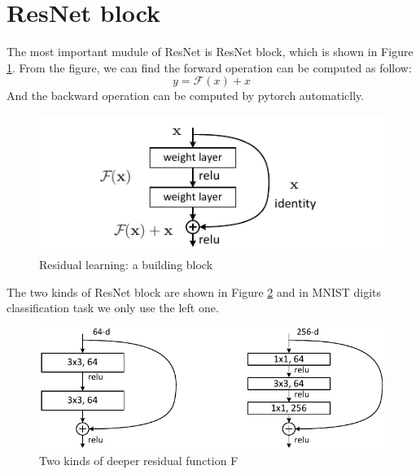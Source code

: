 \documentclass{elegantbook}
\begin{document}
\section{ResNet block}
The most important mudule of ResNet is ResNet block, which is shown in Figure \ref{fig3}. From the figure, we can find the forward operation can be computed as follow:
\begin{equation}
y=\mathcal{F}(x)+x
\end{equation}
And the backward operation can be computed by pytorch automaticlly.
\begin{figure}[!h]
	\centering
	\includegraphics[width=0.8\linewidth]{block.pdf}
	\caption{\label{fig3}Residual learning: a building block}
\end{figure}

The two kinds of ResNet block are shown in Figure \ref{fig4} and in MNIST digits classification task we only use the left one.
\begin{figure}[!h]
	\centering
	\includegraphics[width=0.8\linewidth]{block_deeper.pdf}
	\caption{\label{fig4}Two kinds of deeper residual function F}
\end{figure}
\end{document}
